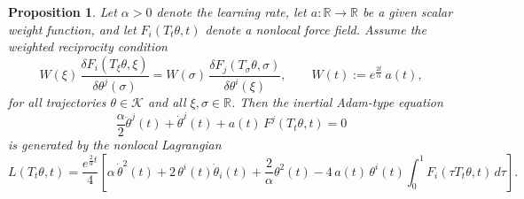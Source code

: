 \documentclass{article} %
\newtheorem{proposition}{Proposition}
\begin{document}
\begin{proposition}\label{prop:nonlocal-lagrangian}
Let $\alpha>0$ denote the learning rate, let $a:\mathbb{R}\to\mathbb{R}$ be a given scalar weight function, and let $F_i(T_t\theta,t)$ denote a nonlocal force field. Assume the weighted reciprocity condition
\begin{equation}\label{eq:reciprocity}
W(\xi)\,\frac{\delta F_i(T_\xi\theta,\xi)}{\delta\theta^j(\sigma)}
=
W(\sigma)\,\frac{\delta F_j(T_\sigma\theta,\sigma)}{\delta\theta^i(\xi)},
\qquad
W(t):=e^{\frac{2t}{\alpha}}\,a(t),
\end{equation}
for all trajectories $\theta\in\mathcal{K}$ and all $\xi,\sigma\in\mathbb{R}$. Then the inertial Adam-type equation
\begin{equation}\label{eq:adamlike-inertial}
\frac{\alpha}{2} \ddot\theta^j(t)+\dot\theta^j(t)+a(t)\,F^j(T_t\theta,t)=0
\end{equation}
is generated by the nonlocal Lagrangian
\begin{equation}\label{eq:Lagrangian}
L(T_t\theta,t)
=
\frac{e^{\frac{2}{\alpha}t}}{4}
\left[
\alpha\,\dot \theta^2(t)
+ 2\,\theta^i(t)\dot\theta_i(t)
+ \frac{2}{\alpha}\theta^2(t)
- 4\,a(t)\,\theta^i(t)\int_0^1 F_i(\tau T_t\theta,t)\,d\tau
\right].
\end{equation}
\end{proposition}
\end{document}
